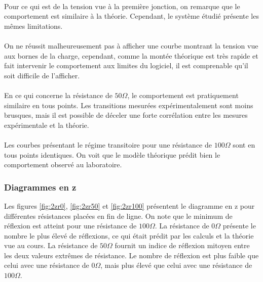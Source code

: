 \paragraph{}Pour ce qui est de la tension vue à la première jonction, on remarque que le comportement est similaire à la théorie. Cependant, le système étudié présente les mêmes limitations. 

\paragraph{}On ne réussit malheureusement pas à afficher une courbe montrant la tension vue aux bornes de la charge, cependant, comme la montée théorique est très rapide et fait intervenir le comportement aux limites du logiciel, il est comprenable qu'il soit difficile de l'afficher. 

\paragraph{}En ce qui concerne la résistance de $50\Omega$, le comportement est pratiquement similaire en tous points. Les transitions mesurées expérimentalement sont moins brusques, mais il est possible de déceler une forte corrélation entre les mesures expérimentale et la théorie. 

\paragraph{}Les courbes présentant le régime transitoire pour une résistance de $100\Omega$ sont en tous points identiques. On voit que le modèle théorique prédit bien le comportement observé au laboratoire. 
\subsubsection{Diagrammes en z}

Les figures \ref{fig:2zr0}, \ref{fig:2zr50} et \ref{fig:2zr100} présentent le diagramme en z pour différentes résistances placées en fin de ligne. On note que le minimum de réflexion est atteint pour une résistance de $100\Omega$. La résistance de $0\Omega$ présente le nombre le plus élevé de réflexions, ce qui était prédit par les calculs et la théorie vue au cours. La résistance de $50\Omega$ fournit un indice de réflexion mitoyen entre les deux valeurs extrêmes de résistance. Le nombre de réflexion est plus faible que celui avec une résistance de $0\Omega$, mais plus élevé que celui avec une résistance de $100\Omega$. 

